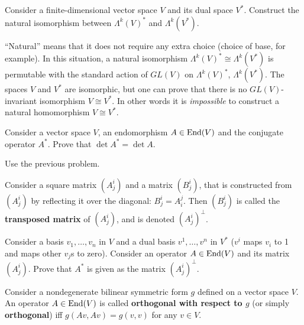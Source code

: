 \documentclass[12pt]{article}
\begin{document}
\begin{zadacha}\label{lambda.dual}
  Consider a finite-dimensional vector space $V$ and its dual space
  $V^*$. Construct the natural isomorphism between $\Lambda^k(V)^*$ and
  $\Lambda^k(V^*)$.
\end{zadacha}

\begin{zamechanie}
  ``Natural'' means that it does not require any extra choice (choice
  of base, for example). In this situation, a natural isomorphism
  $\Lambda^k(V)^*\cong\Lambda^k(V^*)$ is permutable with the standard
  action of $GL(V)$ on $\Lambda^k(V)^*$, $\Lambda^k(V^*)$. The spaces
  $V$ and $V^*$ are isomorphic, but one can prove that there is no
  $GL(V)$-invariant isomorphism $V \cong V^*$. In other words it is
  {\it impossible} to construct a natural homomorphism $V \cong V^*$.
\end{zamechanie}

\begin{zadacha}[!]
  Consider a vector space $V$, an endomorphism $A \in \operatorname{End}(V)$ and 
  the conjugate operator $A^*$. Prove that $\det A^* = \det A$.
\end{zadacha}

\begin{ukazanie}
Use the previous problem.
\end{ukazanie}

\begin{opredelenie}
Consider a square matrix $(A^i_j)$ and a matrix $(B^i_j)$, that is
constructed from $(A^i_j)$ by reflecting it over the diagonal: $B^i_j
=A^j_i$.  Then $(B^i_j)$ is called the {\bf transposed matrix} of
$(A^i_j)$, and is denoted $(A^i_j)^\bot$.
\end{opredelenie}

\begin{zadacha}[!]
  Consider a basis $v_1, \dots, v_n$ in $V$ and a dual basis
  $v^1,\dots, v^n$ in $V^*$ ($v^i$ maps $v_i$ to 1 and maps other
  $v_j$s to zero).  Consider an operator $A \in \operatorname{End}(V)$ and its matrix
  $(A^i_j)$. Prove that $A^*$ is given as the matrix $(A^i_j)^\bot$.
\end{zadacha}

\begin{opredelenie}
  Consider a nondegenerate bilinear symmetric form $g$ defined on a
  vector space $V$. An operator $A\in \operatorname{End}(V)$ is called {\bf
    orthogonal with respect to $g$} (or simply {\bf orthogonal}) iff
  $g(Av, Av) = g(v,v)$ for any $v\in V$.
\end{opredelenie}
\end{document}
